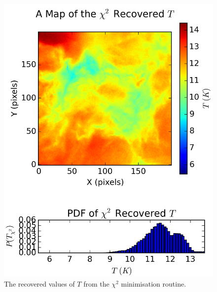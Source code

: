 \documentclass{report}
\begin{document}
\begin{figure}[H]
\begin{minipage}[b]{0.25\linewidth}
    \includegraphics[width=\linewidth]{../img/sph/map_T_chi.png}
    \caption{\protect The recovered values of $T$ from the $\chi^{2}$ minimisation routine.}\label{fig:map_T_chi_sph}
    \vspace{4ex}
  \end{minipage}%
  \begin{minipage}[b]{0.25\linewidth}
    \centering

\end{minipage}
\end{figure}
\end{document}
